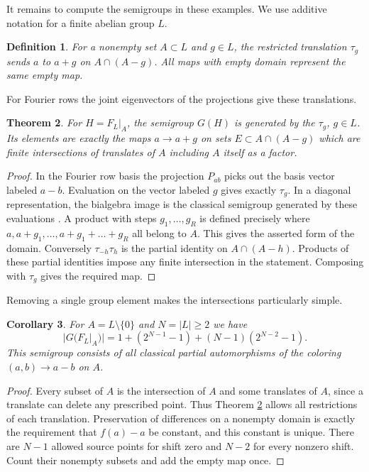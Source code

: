 \documentclass[11pt,a4paper]{article}
\newtheorem{thm}{Theorem}[section]
\newtheorem{cor}[thm]{Corollary}
\newtheorem{defn}[thm]{Definition}
\begin{document}
It remains to compute the semigroups in these examples. We use additive notation for a finite abelian group $L$.

\begin{defn}
For a nonempty set $A\subset L$ and $g\in L$, the restricted translation $\tau_g$ sends $a$ to $a+g$ on $A\cap(A-g)$. All maps with empty domain represent the same empty map.
\end{defn}

For Fourier rows the joint eigenvectors of the projections give these translations.

\begin{thm}\label{translation}
For $H=F_L|_A$, the semigroup $G(H)$ is generated by the $\tau_g$, $g\in L$. Its elements are exactly the maps $a\to a+g$ on sets $E\subset A\cap(A-g)$ which are finite intersections of translates of $A$ including $A$ itself as a factor.
\end{thm}
\begin{proof}
In the Fourier row basis the projection $P_{ab}$ picks out the basis vector labeled $a-b$. Evaluation on the vector labeled $g$ gives exactly $\tau_g$. In a diagonal representation, the bialgebra image is the classical semigroup generated by these evaluations \cite{bs}. A product with steps $g_1,\ldots,g_R$ is defined precisely where $a,a+g_1,\ldots,a+g_1+\ldots+g_R$ all belong to $A$. This gives the asserted form of the domain. Conversely $\tau_{-h}\tau_h$ is the partial identity on $A\cap(A-h)$. Products of these partial identities impose any finite intersection in the statement. Composing with $\tau_g$ gives the required map.
\end{proof}

Removing a single group element makes the intersections particularly simple.

\begin{cor}
For $A=L\setminus\{0\}$ and $N=|L|\geq2$ we have
\[
 |G(F_L|_A)|=1+(2^{N-1}-1)+(N-1)(2^{N-2}-1).
\]
This semigroup consists of all classical partial automorphisms of the coloring $(a,b)\to a-b$ on $A$.
\end{cor}
\begin{proof}
Every subset of $A$ is the intersection of $A$ and some translates of $A$, since a translate can delete any prescribed point. Thus Theorem \ref{translation} allows all restrictions of each translation. Preservation of differences on a nonempty domain is exactly the requirement that $f(a)-a$ be constant, and this constant is unique. There are $N-1$ allowed source points for shift zero and $N-2$ for every nonzero shift. Count their nonempty subsets and add the empty map once.
\end{proof}
\end{document}
